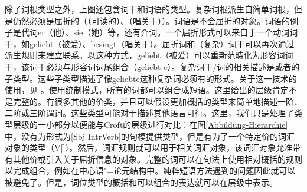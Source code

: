 除了词根类型之外，上图还包含词干和词语的类型。复杂词根派生自简单词根，但是仍然必须是屈折的（（可读的）、（唱关于））。词语是不会屈折的对象。词语的例子是代词er（他）、sie（她）等，还有介词。一个屈折形式可以来自于一个动词词干，如geliebt（被爱）、besingt（唱关于）。屈折词和（复杂）词干可以再次通过派生规则来建立联系。以这种方式，geliebt（被爱）可以重新范畴化为形容词词干，该词干必须与形容词词尾组合（geliebt-e）。复杂词干/词的相关描述是或者的子类型。这些子类型描述了像geliebte这种复杂词必须有的形式。关于这一技术的使用，见 。使用统制模式，所有的词都可以组合成短语。这里给出的层级肯定不是完整的。有很多其他的价类，并且可以假设更加概括的类型来简单地描述一阶、二阶或三阶谓词。这些类型可能对于描述其他语言可行。这里，我们只是处理了类型层级的一小部分以便能与Croft的层级进行对比：在图\ref{Abbildung-Hierarchie}中，没有为形式为[Sbj IntrVerb]的句模提供类型，但是有为了一个特定价的词汇对象的类型（V[\subcat {}]）。然后，词汇规则就可以用于相关词汇对象，该词汇对象允准带有其他价或引入关于屈折信息的对象。完整的词可以在句法上使用相对概括的规则以完成组合，例如在中心语"=论元结构中。纯粹短语方法遇到的问题因此就可以被避免了。但是，词位类型的概括和可以组合的表达就可以在层级中表示。
